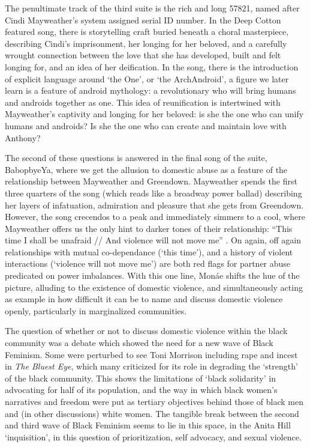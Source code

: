 \documentclass[a4paper, 11pt]{article} %
\begin{document}
The penultimate track of the third suite is the rich and long 57821, named after Cindi Mayweather's system assigned serial ID number.
In the Deep Cotton featured song, there is storytelling craft buried beneath a choral masterpiece, describing Cindi's imprisonment, her longing for her beloved, and a carefully wrought connection between the love that she has developed, built and felt longing for, and an idea of her deification.
In the song, there is the introduction of explicit language around `the One', or `the ArchAndroid', a figure we later learn is a feature of android mythology: a revolutionary who will bring humans and androids together as one.
This idea of reunification is intertwined with Mayweather's captivity and longing for her beloved: is she the one who can unify humans and androids? Is she the one who can create and maintain love with Anthony?

The second of these questions is answered in the final song of the suite, BabopbyeYa, where we get the allusion to domestic abuse as a feature of the relationship between Mayweather and Greendown.
Mayweather spends the first three quarters of the song (which reads like a broadway power ballad) describing her layers of infatuation, admiration and pleasure that she gets from Greendown.
However, the song crecendos to a peak and immediately simmers to a cool, where Mayweather offers us the only hint to darker tones of their relationship: ``This time I shall be unafraid // And violence will not move me'' \cite{babopbyeya}.
On again, off again relationships with mutual co-dependance (`this time'), and a history of violent interactions (`violence will not move me') are both red flags for partner abuse predicated on power imbalances.
With this one line, Mon\'ae shifts the hue of the picture, alluding to the existence of domestic violence, and simultaneously acting as example in how difficult it can be to name and discuss domestic violence openly, particularly in marginalized communities.

The question of whether or not to discuss domestic violence within the black community was a debate which showed the need for a new wave of Black Feminism.
Some were perturbed to see Toni Morrison including rape and incest in \emph{The Bluest Eye}, which many criticized for its role in degrading the `strength' of the black community.
This shows the limitations of `black solidarity' in advocating for half of its population, and the way in which black women's narratives and freedom were put as tertiary objectives behind those of black men and (in other discussions) white women.
The tangible break between the second and third wave of Black Feminism seems to lie in this space, in the Anita Hill `inquisition', in this question of prioritization, self advocacy, and sexual violence.
\end{document}

